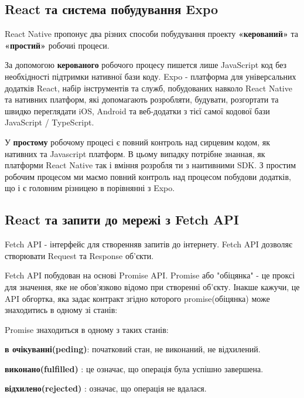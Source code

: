 \subsection{React та система побудування Expo}
\label{subsec:rn_expo}
React Native пропонує два різних способи побудування проекту \textbf{«керований»} та \textbf{«простий»} робочиі процеси.

За допомогою \textbf{керованого} робочого процесу пишется лише JavaScript код без необхідності підтримки нативної бази коду.
Expo - платформа для універсальних додатків React, набір інструментів та служб, побудованих навколо
React Native та нативних платформ, які допомагають розробляти, будувати, розгортати та швидко переглядати iOS,
Android та веб-додатки з тієї самої кодової бази JavaScript / TypeScript.\cite{expo_doc}

У \textbf{простому} робочому процесі є повний контроль над сирцевим кодом, як нативних та Javascript платформ.
В цьому випадку потрібне знанная, як платформи React Native так і вміння розробля ти з наитивними SDK.
З простим робочим процесом ми маємо повний контроль над процесом побудови додатків, що і є головним різницею в порівнянні з Expo.

\subsection{React та запити до мережі з Fetch API}
\label{subsec:rn_fetch_api}

Fetch API - інтерфейс для створенняв запитів до інтернету.
Fetch API дозволяє створювати Request та Response об'єкти.

Fetch API побудован на основі Promise API.
Promise або "обіцянка" - це проксі для значення, яке не обов'язково відомо при створенні об'єкту.\cite{promise_doc}
Інакше кажучи, це API обгортка, яка задає контракт згідно которого promise(обіцянка) може знаходитись в одному зі станів:

Promise знаходиться в одному з таких станів:
\begin{itemize}
    \begin{item}
        \textbf{в очікуванні(peding)}: початковий стан, не виконаний, не відхилений.
    \end{item}
    \begin{item}
        \textbf{виконано(fulfilled)} : це означає, що операція була успішно завершена.
    \end{item}
    \begin{item}
        \textbf{відхилено(rejected)} : означає, що операція не вдалася.
    \end{item}
\end{itemize}

